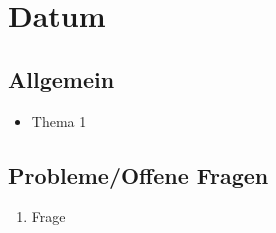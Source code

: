 \section*{Datum}

\subsection*{Allgemein}
\begin{itemize}
	\item Thema 1
\end{itemize}

\subsection*{Probleme/Offene Fragen}
\begin{enumerate}
	\item Frage
\end{enumerate}